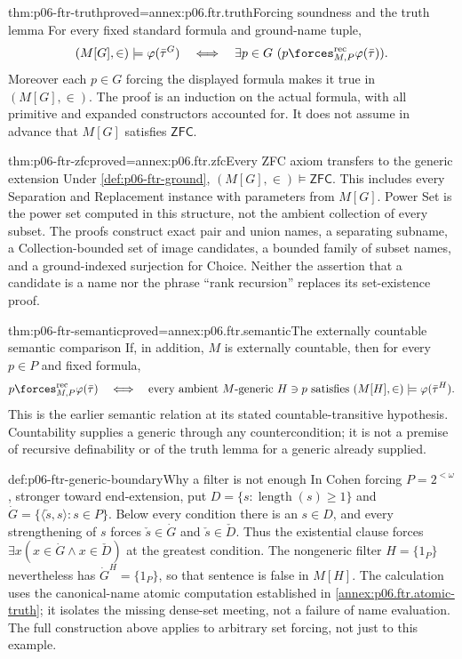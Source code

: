 \begin{hbtheorem}{thm:p06-ftr-truth}{proved=annex:p06.ftr.truth}{Forcing soundness and the truth lemma}
For every fixed standard formula and ground-name tuple,
\[
 (M[G],\in)\models\varphi(\bar\tau^G)
 \quad\Longleftrightarrow\quad
 \exists p\in G\ (p\forces^{\mathrm{rec}}_{M,P}\varphi(\bar\tau)).
\]
Moreover each \(p\in G\) forcing the displayed formula makes it true in
\((M[G],\in)\). The proof is an induction on the actual formula, with
all primitive and expanded constructors accounted for. It does not assume
in advance that \(M[G]\) satisfies \(\mathsf{ZFC}\).
\end{hbtheorem}

\begin{hbtheorem}{thm:p06-ftr-zfc}{proved=annex:p06.ftr.zfc}{Every ZFC axiom transfers to the generic extension}
Under \cref{def:p06-ftr-ground}, \((M[G],\in)\models\mathsf{ZFC}\).
This includes every Separation and Replacement instance with parameters
from \(M[G]\). Power Set is the power set computed in this structure,
not the ambient collection of every subset. The proofs construct exact
pair and union names, a separating subname, a Collection-bounded set of
image candidates, a bounded family of subset names, and a ground-indexed
surjection for Choice. Neither the assertion that a candidate is a name
nor the phrase ``rank recursion'' replaces its set-existence proof.
\end{hbtheorem}

\begin{hbcorollary}{thm:p06-ftr-semantic}{proved=annex:p06.ftr.semantic}{The externally countable semantic comparison}
If, in addition, \(M\) is externally countable, then for every \(p\in P\)
and fixed formula,
\[
 p\forces^{\mathrm{rec}}_{M,P}\varphi(\bar\tau)
 \quad\Longleftrightarrow\quad
 \text{every ambient }M\text{-generic }H\ni p
       \text{ satisfies }(M[H],\in)\models\varphi(\bar\tau^H).
\]
This is the earlier semantic relation at its stated countable-transitive
hypothesis. Countability supplies a generic through any countercondition;
it is not a premise of recursive definability or of the truth lemma for a
generic already supplied.
\end{hbcorollary}

\begin{hbexample}{def:p06-ftr-generic-boundary}{Why a filter is not enough}
In Cohen forcing \(P=2^{<\omega}\), stronger toward end-extension, put
\(D=\{s:\operatorname{length}(s)\geq1\}\) and
\(\dot G=\{\langle\check s,s\rangle:s\in P\}\).
Below every condition there is an \(s\in D\), and every strengthening of
\(s\) forces \(\check s\in\dot G\) and
\(\check s\in\check D\). Thus the existential clause forces
\(\exists x(x\in\dot G\land x\in\check D)\) at the greatest condition.
The nongeneric filter \(H=\{1_P\}\) nevertheless has
\(\dot G^H=\{1_P\}\), so that sentence is false in \(M[H]\).
The calculation uses the canonical-name atomic computation established in
\cref{annex:p06.ftr.atomic-truth}; it isolates the missing dense-set meeting,
not a failure of name evaluation. The full construction above applies to
arbitrary set forcing, not just to this example.
\end{hbexample}

